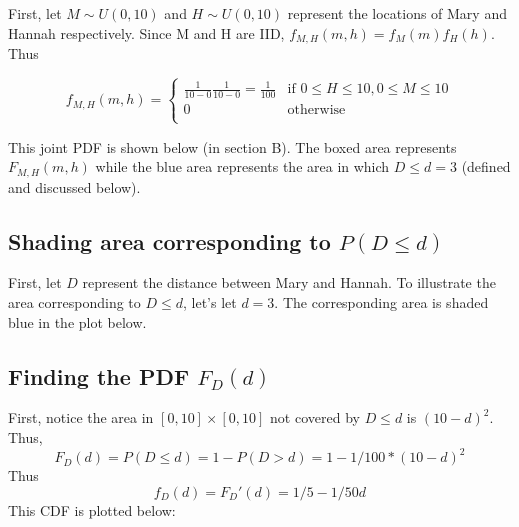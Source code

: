 \documentclass[paper=a4, fontsize=11pt]{scrartcl} %
\numberwithin{equation}{section} %
\numberwithin{figure}{section} %
\numberwithin{table}{section} %
\begin{document}
First, let $M \sim U(0,10)$ and $H \sim U(0,10)$ represent the locations of Mary and Hannah respectively. Since M and H are IID, $f_{M, H}(m,h) = f_M(m)f_H(h)$. Thus

\[
f_{M,H}(m,h) = 
\begin{cases}
		\frac{1}{10-0}\frac{1}{10-0}=\frac{1}{100} & \textrm{if } 0 \leq H \leq 10, 0 \leq M \leq 10 \\
		0 & \textrm{otherwise}\\
\end{cases}
\]


This joint PDF is shown below (in section B). The boxed area represents $F_{M, H}(m,h)$ while the blue area represents the area in which $D \leq d=3$ (defined and discussed below).

\subsection{Shading area corresponding to $P(D \leq d)$}

First, let $D$ represent the distance between Mary and Hannah. To illustrate the area corresponding to $D \leq d$, let's let $d=3$. The corresponding area is shaded blue in the plot below.

\begin{center}
\end{center}

\subsection{Finding the PDF $F_D(d)$}

First, notice the area in $[0,10] \times [0,10]$ not covered by $D \leq d$ is $(10-d)^2$. Thus,
\begin{equation*}
F_D(d) = P(D \leq d) = 1 - P(D > d) = 1 - 1/100 * (10-d)^2
\end{equation*}
Thus
\begin{equation*}
f_D(d) = F_D'(d) = 1/5 - 1/50 d
\end{equation*}   
This CDF is plotted below:
\end{document}
